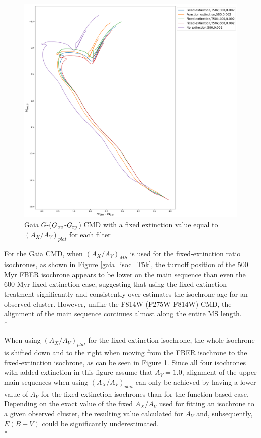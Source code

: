 \documentclass[12pt, a4paper]{report}
\begin{document}
\begin{figure}[h]
\begin{center}
\includegraphics[width=1.0\textwidth]{../basti_isochrones_10_13Gyr/Extinction_T50k_FeH0fix_func_G_GbpmGrp_500_400_600_Myr_FeH_0p002_ref_noext_Av_1p0.pdf}
\caption{Gaia $G$-($G_{\textnormal{bp}}$-$G_{\textnormal{rp}}$) CMD with a fixed extinction value equal to $(A_{X}/A_{V})_{plat}$ for each filter}
\label{gaia_isoc_T50k}
\end{center}
\end{figure}

For the Gaia CMD, when $(A_{X}/A_{V})_{MS}$ is used for the fixed-extinction ratio isochrones, as shown in Figure \ref{gaia_isoc_T5k}, the turnoff position of the 500 Myr FBER isochrone appears to be lower on the main sequence than even the 600 Myr fixed-extinction case, suggesting that using the fixed-extinction treatment significantly and consistently over-estimates the isochrone age for an observed cluster. However, unlike the F814W-(F275W-F814W) CMD, the alignment of the main sequence continues almost along the  entire MS length. \\*

When using $(A_{X}/A_{V})_{plat}$ for the fixed-extinction isochrone, the whole isochrone is shifted down and to the right when moving from the FBER isochrone to the fixed-extinction isochrone, as can be seen in Figure \ref{gaia_isoc_T50k}. Since all four isochrones with added extinction in this figure assume that $A_{V} = 1.0$, alignment of the upper main sequences when using $(A_{X}/A_{V})_{plat}$ can only be achieved by having a lower value of $A_{V}$ for the fixed-extinction isochrones than for the function-based case. Depending on the exact value of the fixed $A_{X}/A_{V}$ used for fitting an isochrone to a given observed cluster, the resulting value calculated for $A_{V}$ and, subsequently, $E(B-V)$ could be significantly underestimated. \\*
\end{document}
